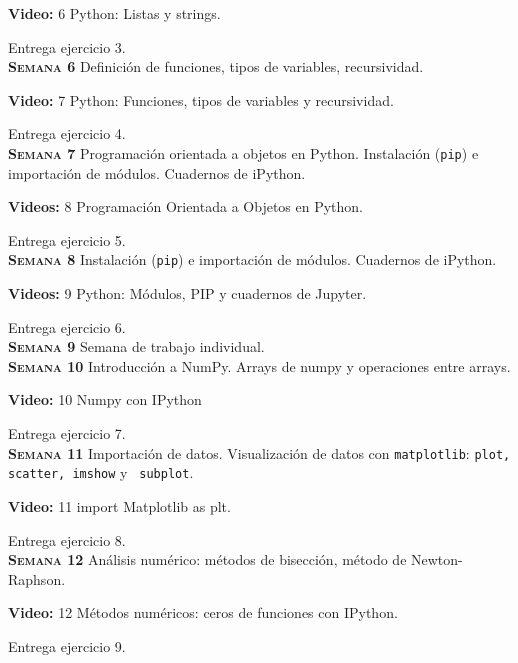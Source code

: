 \documentclass[letterpaper,10pt,onecolumn]{article}
\begin{document}
\textbf{Video:} 6  Python: Listas y strings.

Entrega ejercicio 3.
\\[-0.3cm] 

\noindent\textbf{\textsc{Semana 6}} Definición de funciones,
tipos de variables, recursividad. 

\textbf{Video:} 7 Python: Funciones, tipos de variables y recursividad.

Entrega ejercicio 4.
\\[-0.3cm] 

\noindent\textbf{\textsc{Semana 7}} Programaci\'on orientada a objetos en Python.   Instalación (\verb+pip+) e importación de módulos. Cuadernos de iPython.

\textbf{Videos:} 8 Programación Orientada a Objetos en Python.

Entrega ejercicio 5.
\\[-0.3cm]  

\noindent\textbf{\textsc{Semana 8}} Instalación (\verb+pip+) e importación de módulos. Cuadernos de iPython.

\textbf{Videos:} 9 Python: Módulos, PIP y cuadernos de Jupyter.

Entrega ejercicio 6.
\\[-0.3cm]  


\noindent\textbf{\textsc{Semana 9}}  Semana de trabajo individual.
\\[-0.3cm]  

\noindent\textbf{\textsc{Semana 10}} Introducción a NumPy. Arrays de numpy y operaciones entre arrays. 

\textbf{Video:} 10 Numpy con IPython

Entrega ejercicio 7.
\\[-0.3cm]  


\noindent\textbf{\textsc{Semana 11}}  Importación de datos. Visualización de datos con
\verb+matplotlib+: \verb+plot, scatter, imshow+ y  \verb+ subplot+.

\textbf{Video:} 11 import Matplotlib as plt.

Entrega ejercicio 8.
\\[-0.3cm]  

\noindent\textbf{\textsc{Semana 12}} Análisis numérico: métodos de bisección, método de Newton-Raphson. 

\textbf{Video:} 12 Métodos numéricos: ceros de funciones con IPython.

Entrega ejercicio 9.
\\[-0.3cm]  
\end{document}
